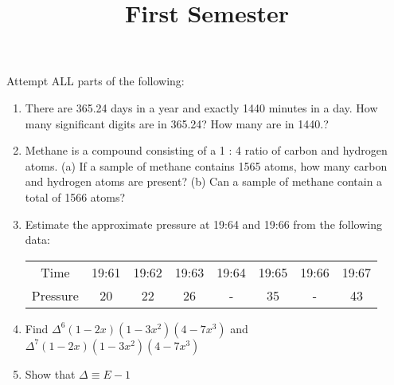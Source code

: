 \documentclass[11pt]{article}
\title{First Semester}
\begin{document}
 
\begin{questions}
\question Attempt ALL parts of the following: 
	\begin{enumerate}
	\item There are 365.24 days in a year and exactly 1440 minutes in a day. How many significant digits are in 365.24? How many are in 1440.?
	\item Methane is a compound consisting of a 1 : 4 ratio of carbon and hydrogen atoms. (a) If a sample of methane contains 1565 atoms, how many carbon and hydrogen atoms are present? (b) Can a sample of methane contain a total of 1566 atoms?
	\item Estimate the approximate pressure at 19:64 and 19:66 from the following data:
			\begin{table}[h!]
			\centering
				\begin{tabular}{c c c c c c c c}
				   Time & 19:61 & 19:62 &  19:63 &  19:64 & 19:65  & 19:66 & 19:67 \\
				 	 Pressure & 20 &  22 & 26 & - & 35 & - & 43 \\
				\end{tabular}
				\end{table}
				\vspace{-0.3cm}
	\item Find $\Delta^6(1-2x)(1-3x^2)(4-7x^3)$ and $\Delta^7(1-2x)(1-3x^2)(4-7x^3)$
 	\item Show that $\Delta \equiv E-1$


\end{enumerate}
\end{questions}
\end{document}
